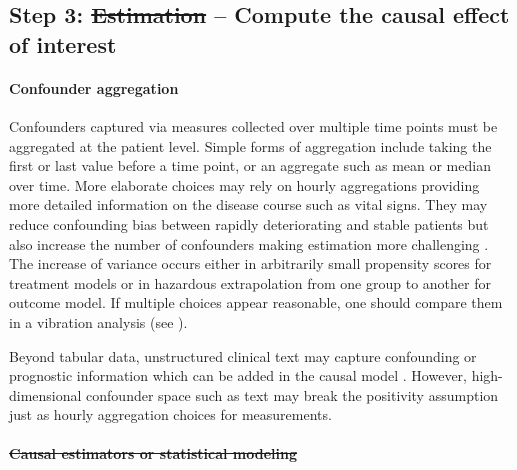 \documentclass[10pt,letterpaper]{article}
\providecommand{\DIFaddtex}[1]{{\protect\color{blue}\uwave{#1}}} %
\providecommand{\DIFdeltex}[1]{{\protect\color{red}\sout{#1}}}                      %
\providecommand{\DIFaddbegin}{} %
\providecommand{\DIFaddend}{} %
\providecommand{\DIFdelbegin}{} %
\providecommand{\DIFdelend}{} %
\providecommand{\DIFadd}[1]{\texorpdfstring{\DIFaddtex{#1}}{#1}} %
\providecommand{\DIFdel}[1]{\texorpdfstring{\DIFdeltex{#1}}{}} %
\newcommand{\DIFscaledelfig}{0.5}
\newlength{\DIFdelgraphicswidth} %
\newlength{\DIFdelgraphicsheight} %
\newcommand{\DIFaddincludegraphics}[2][]{{\color{blue}\fbox{\DIFOincludegraphics[#1]{#2}}}} %
\newcommand{\DIFdelincludegraphics}[2][]{%
\sbox{\DIFdelgraphicsbox}{\DIFOincludegraphics[#1]{#2}}%
\settoboxwidth{\DIFdelgraphicswidth}{\DIFdelgraphicsbox} %
\settoboxtotalheight{\DIFdelgraphicsheight}{\DIFdelgraphicsbox} %
\scalebox{\DIFscaledelfig}{%
\parbox[b]{\DIFdelgraphicswidth}{\usebox{\DIFdelgraphicsbox}\\[-\baselineskip] \rule{\DIFdelgraphicswidth}{0em}}\llap{\resizebox{\DIFdelgraphicswidth}{\DIFdelgraphicsheight}{%
\setlength{\unitlength}{\DIFdelgraphicswidth}%
\begin{picture}(1,1)%
\thicklines\linethickness{2pt} %
{\color[rgb]{1,0,0}\put(0,0){\framebox(1,1){}}}%
{\color[rgb]{1,0,0}\put(0,0){\line( 1,1){1}}}%
{\color[rgb]{1,0,0}\put(0,1){\line(1,-1){1}}}%
\end{picture}%
}\hspace*{3pt}}} %
} %
\DeclareRobustCommand{\DIFaddbegin}{\DIFOaddbegin \let\includegraphics\DIFaddincludegraphics} %
\DeclareRobustCommand{\DIFaddend}{\DIFOaddend \let\includegraphics\DIFOincludegraphics} %
\DeclareRobustCommand{\DIFdelbegin}{\DIFOdelbegin \let\includegraphics\DIFdelincludegraphics} %
\DeclareRobustCommand{\DIFdelend}{\DIFOaddend \let\includegraphics\DIFOincludegraphics} %
\begin{document}
\DIFaddend \subsection*{Step 3: \DIFdelbegin \DIFdel{Estimation }\DIFdelend \DIFaddbegin \DIFadd{Statistical estimation }\DIFaddend -- Compute the causal effect of interest}\label{sec:estimation}

%

\paragraph{Confounder aggregation}
Confounders captured via measures collected over multiple time points must be
aggregated at the patient level. Simple forms of aggregation include taking the
first or last value before a time point, or an aggregate such as mean or median
over time. More elaborate choices may rely on hourly aggregations providing more
detailed information on the disease course such as vital signs. They may reduce
confounding bias between rapidly deteriorating and stable patients but also
increase the number of confounders making estimation more challenging
\cite{damour2020overlap}. The increase of variance occurs either in
arbitrarily small propensity scores for treatment models or in hazardous
extrapolation from one group to another for outcome model. If multiple
choices appear reasonable, one should compare them in a vibration analysis
(see ).

Beyond tabular data, unstructured clinical text may capture confounding or
prognostic information \cite{horng2017creating,jiang2023health} which can be
added in the causal model \cite{zeng2022uncovering}.
However, high-dimensional
confounder space such as text may break the positivity assumption just as hourly
aggregation choices for measurements.

\DIFdelbegin \paragraph{\DIFdel{Causal estimators or statistical modeling}}
\addtocounter{paragraph}{-1}%
\end{document}
